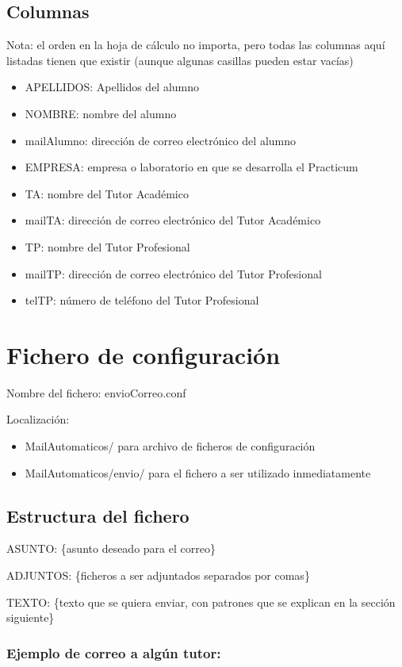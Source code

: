 \documentclass[11pt]{article}
\begin{document}
\subsection{Columnas}
\label{sec-3-2}
Nota: el orden en la hoja de cálculo no importa, pero todas las columnas aquí listadas tienen que existir (aunque algunas casillas pueden estar vacías)
\begin{itemize}
\item APELLIDOS: Apellidos del alumno
\item NOMBRE: nombre del alumno
\item mailAlumno: dirección de correo electrónico del alumno
\item EMPRESA: empresa o laboratorio en que se desarrolla el Practicum
\item TA: nombre del Tutor Académico
\item mailTA: dirección de correo electrónico del Tutor Académico
\item TP: nombre del Tutor Profesional
\item mailTP: dirección de correo electrónico del Tutor Profesional
\item telTP: número de teléfono del Tutor Profesional
\end{itemize}

\section{Fichero de configuración}
\label{sec-4}
Nombre del fichero: envioCorreo.conf

Localización:
\begin{itemize}
\item MailAutomaticos/ para archivo de ficheros de configuración
\item MailAutomaticos/envio/ para el fichero a ser utilizado inmediatamente
\end{itemize}
\subsection{Estructura del fichero}
\label{sec-4-1}
ASUNTO: \{asunto deseado para el correo\}

ADJUNTOS: \{ficheros a ser adjuntados separados por comas\}

TEXTO: \{texto que se quiera enviar, con patrones que se explican en la sección siguiente\}

\subsubsection{Ejemplo de correo a algún tutor:}
\label{sec-4-1-1}
\end{document}
